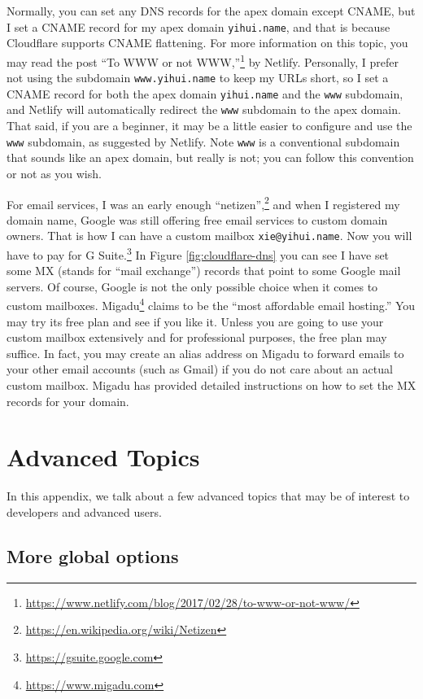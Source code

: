 \documentclass[12pt,]{krantz}
\renewcommand{\href}[2]{#2\footnote{\url{#1}}}
\theoremstyle{definition}
\theoremstyle{definition}
\theoremstyle{definition}
\theoremstyle{remark}
\begin{document}
Normally, you can set any DNS records for the apex domain except CNAME,
but I set a CNAME record for my apex domain \texttt{yihui.name}, and
that is because Cloudflare supports CNAME flattening. For more
information on this topic, you may read the post
\href{https://www.netlify.com/blog/2017/02/28/to-www-or-not-www/}{``To
WWW or not WWW,''} by Netlify. Personally, I prefer not using the
subdomain \texttt{www.yihui.name} to keep my URLs short, so I set a
CNAME record for both the apex domain \texttt{yihui.name} and the
\texttt{www} subdomain, and Netlify will automatically redirect the
\texttt{www} subdomain to the apex domain. That said, if you are a
beginner, it may be a little easier to configure and use the
\texttt{www} subdomain, as suggested by Netlify. Note \texttt{www} is a
conventional subdomain that sounds like an apex domain, but really is
not; you can follow this convention or not as you wish.

For email services, I was an early enough
\href{https://en.wikipedia.org/wiki/Netizen}{``netizen'',} and when I
registered my domain name, Google was still offering free email services
to custom domain owners. That is how I can have a custom mailbox
\texttt{xie@yihui.name}. Now you will have to pay for
\href{https://gsuite.google.com}{G Suite.} In Figure
\ref{fig:cloudflare-dns} you can see I have set some MX (stands for
``mail exchange'') records that point to some Google mail servers. Of
course, Google is not the only possible choice when it comes to custom
mailboxes. \href{https://www.migadu.com}{Migadu} claims to be the ``most
affordable email hosting.'' You may try its free plan and see if you
like it. Unless you are going to use your custom mailbox extensively and
for professional purposes, the free plan may suffice. In fact, you may
create an alias address on Migadu to forward emails to your other email
accounts (such as Gmail) if you do not care about an actual custom
mailbox. Migadu has provided detailed instructions on how to set the MX
records for your domain.

\chapter{Advanced Topics}\label{advanced-topics}

In this appendix, we talk about a few advanced topics that may be of
interest to developers and advanced users.

\section{More global options}\label{more-global-options}
\end{document}

